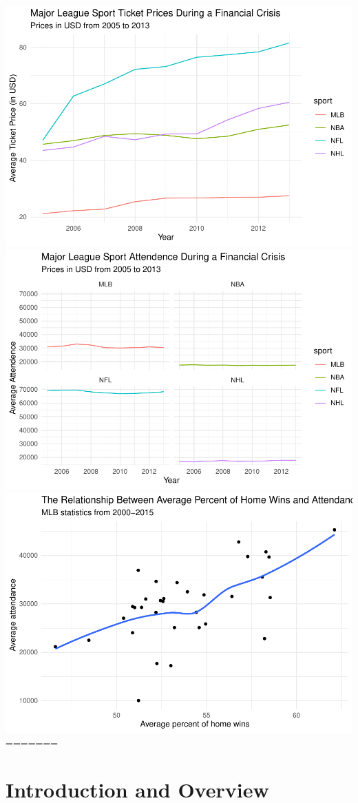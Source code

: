 \documentclass[man, fleqn, noextraspace,floatsintext]{apa6}
\begin{document}
\includegraphics{Final_Project_files/figure-latex/sports_crisis-1.pdf}
\includegraphics{Final_Project_files/figure-latex/sports_crisis-2.pdf}
\includegraphics{Final_Project_files/figure-latex/sports_crisis-3.pdf}
=======
\hypertarget{introduction-and-overview}{%
\section{Introduction and Overview}\label{introduction-and-overview}}
\end{document}
